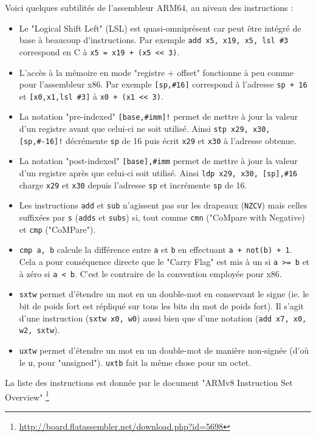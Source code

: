 \documentclass[a4paper,10pt]{article}
\newcommand{\lsl}[1]{\textless{}\textless{} #1} %
\begin{document}
\begin{appendices}
Voici quelques subtilités de l'assembleur ARM64, au niveau des instructions :
\begin{itemize}
\item Le "Logical Shift Left" (LSL) est quasi-omniprésent car peut être intégré de base à beaucoup d'instructions. Par exemple \texttt{add x5, x19, x5, lsl \#3} correspond en C à \texttt{x5 = x19 + (x5 \lsl 3)}.
\item L'accès à la mémoire en mode "registre + offset" fonctionne à peu comme pour l'assembleur x86. Par exemple \texttt{[sp,\#16]} correspond à l'adresse \texttt{sp + 16} et \texttt{[x0,x1,lsl \#3]} à \texttt{x0 + (x1 \lsl 3)}.
\item La notation "pre-indexed" \texttt{[base,\#imm]!} permet de mettre à jour la valeur d'un registre avant que celui-ci ne soit utilisé. Ainsi \texttt{stp x29, x30, [sp,\#-16]!} décrémente \texttt{sp} de 16 puis écrit \texttt{x29} et \texttt{x30} à l'adresse obtenue.
\item La notation "post-indexed" \texttt{[base],\#imm} permet de mettre à jour la valeur d'un registre après que celui-ci soit utilisé. Ainsi \texttt{ldp x29, x30, [sp],\#16} charge \texttt{x29} et \texttt{x30} depuis l'adresse \texttt{sp} et incrémente \texttt{sp} de 16.
\item Les instructions \texttt{add} et \texttt{sub} n'agissent pas sur les drapeaux (\texttt{NZCV}) mais celles suffixées par \texttt{s} (\texttt{adds} et \texttt{subs}) si, tout comme \texttt{cmn} ("CoMpare with Negative) et \texttt{cmp} ("CoMPare").
\item \texttt{cmp a, b} calcule la différence entre \texttt{a} et \texttt{b} en effectuant \texttt{a + not(b) + 1}. Cela a pour conséquence directe que le "Carry Flag" est mis à un si \texttt{a >= b} et à zéro si \texttt{a < b}. C'est le contraire de la convention employée pour x86.
\item \texttt{sxtw} permet d'étendre un mot en un double-mot en conservant le signe (ie. le bit de poids fort est répliqué sur tous les bits du mot de poids fort). Il s'agit d'une instruction (\texttt{sxtw x0, w0}) aussi bien que d'une notation (\texttt{add x7, x0, w2, sxtw}).
\item \texttt{uxtw} permet d'étendre un mot en un double-mot de manière non-signée (d'où le \texttt{u}, pour "unsigned"). \texttt{uxtb} fait la même chose pour un octet.
\end{itemize}

La liste des instructions est donnée par le document "ARMv8 Instruction Set Overview" \footnote{\url{http://board.flatassembler.net/download.php?id=5698}}


\end{appendices}
\end{document}
